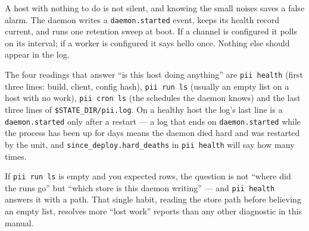 A host with nothing to do is not silent, and knowing the small noises saves a false alarm.
The daemon writes a \texttt{daemon.started} event, keeps its health record current, and
runs one retention sweep at boot. If a channel is configured it polls on its interval; if a
worker is configured it says hello once. Nothing else should appear in the log.

The four readings that answer \enquote{is this host doing anything} are
\texttt{pii health} (first three lines: build, client, config hash), \texttt{pii run ls}
(usually an empty list on a host with no work), \texttt{pii cron ls} (the schedules the
daemon knows) and the last three lines of \texttt{\$STATE\_DIR/pii.log}. On a healthy host
the log's last line is a \texttt{daemon.started} only after a restart --- a log that ends on
\texttt{daemon.started} while the process has been up for days means the daemon died hard
and was restarted by the unit, and \texttt{since\_deploy.hard\_deaths} in \texttt{pii
health} will say how many times.

If \texttt{pii run ls} is empty and you expected rows, the question is not \enquote{where did
the runs go} but \enquote{which store is this daemon writing} --- and \texttt{pii health}
answers it with a path. That single habit, reading the store path before believing an empty
list, resolves more \enquote{lost work} reports than any other diagnostic in this manual.
